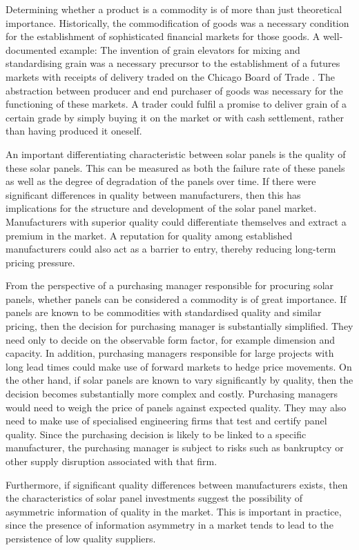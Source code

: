 \documentclass[a4paper]{article}
\begin{document}
Determining whether a product is a commodity is of more than just theoretical importance. Historically, the commodification of goods was a necessary condition for the establishment of sophisticated financial markets for those goods. A well-documented example: The invention of grain elevators for mixing and standardising grain was a necessary precursor to the establishment of a futures markets with receipts of delivery traded on the Chicago Board of Trade \citep{cronon_natures_1992}. The abstraction between producer and end purchaser of goods was necessary for the functioning of these markets. A trader could fulfil a promise to deliver grain of a certain grade by simply buying it on the market or with cash settlement, rather than having produced it oneself.

An important differentiating characteristic between solar panels is the quality of these solar panels. This can be measured as both the failure rate of these panels as well as the degree of degradation of the panels over time. If there were significant differences in quality between manufacturers, then this has implications for the structure and development of the solar panel market. Manufacturers with superior quality could differentiate themselves and extract a premium in the market. A reputation for quality among established manufacturers could also act as a barrier to entry, thereby reducing long-term pricing pressure.

From the perspective of a purchasing manager responsible for procuring solar panels, whether panels can be considered a commodity is of great importance. If panels are known to be commodities with standardised quality and similar pricing, then the decision for purchasing manager is substantially simplified. They need only to decide on the observable form factor, for example dimension and capacity. In addition, purchasing managers responsible for large projects with long lead times could make use of forward markets to hedge price movements. On the other hand, if solar panels are known to vary significantly by quality, then the decision becomes substantially more complex and costly. Purchasing managers would need to weigh the price of panels against expected quality. They may also need to make use of specialised engineering firms that test and certify panel quality. Since the purchasing decision is likely to be linked to a specific manufacturer, the purchasing manager is subject to risks such as bankruptcy or other supply disruption associated with that firm.

Furthermore, if significant quality differences between manufacturers exists, then the characteristics of solar panel investments suggest the possibility of asymmetric information of quality in the market. This is important in practice, since the presence of information asymmetry in a market tends to lead to the persistence of low quality suppliers.
\end{document}
